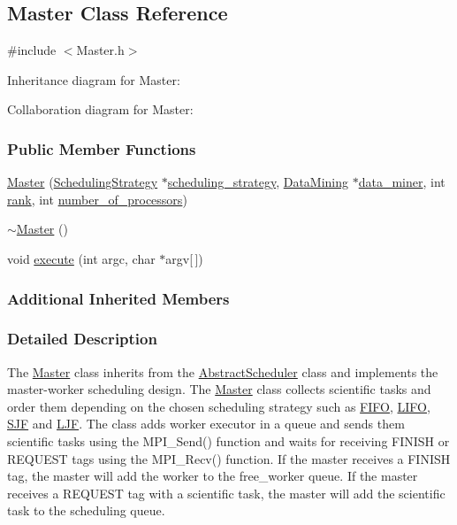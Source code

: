 \hypertarget{a00026}{}\subsection{Master Class Reference}
\label{a00026}


{\ttfamily \#include $<$Master.\+h$>$}



Inheritance diagram for Master\+:


Collaboration diagram for Master\+:
\subsubsection*{Public Member Functions}
\begin{DoxyCompactItemize}
\item 
\hyperlink{a00026_a4ffd1a0c99fc39712ac89c50f87dedfa}{Master} (\hyperlink{a00033}{Scheduling\+Strategy} $\ast$\hyperlink{a00004_a7dd11eee79bfb44c820d6c28480fd0c7}{scheduling\+\_\+strategy}, \hyperlink{a00013}{Data\+Mining} $\ast$\hyperlink{a00004_a6e281d90fa4b965779cd13eabf7d0249}{data\+\_\+miner}, int \hyperlink{a00015_a33c24e2887b4d9c4ef7f3566d3bc803e}{rank}, int \hyperlink{a00015_a4e798bde66d26fe200de7e8d2b54e915}{number\+\_\+of\+\_\+processors})
\item 
\hyperlink{a00026_a20f70958ed75532ba672af1b780f59eb}{$\sim$\+Master} ()
\item 
void \hyperlink{a00026_acea94dce898273bbbddfaae52f243bca}{execute} (int argc, char $\ast$argv\mbox{[}$\,$\mbox{]})
\end{DoxyCompactItemize}
\subsubsection*{Additional Inherited Members}


\subsubsection{Detailed Description}
The \hyperlink{a00026}{Master} class inherits from the \hyperlink{a00004}{Abstract\+Scheduler} class and implements the master-\/worker scheduling design. The \hyperlink{a00026}{Master} class collects scientific tasks and order them depending on the chosen scheduling strategy such as \hyperlink{a00016}{F\+I\+F\+O}, \hyperlink{a00022}{L\+I\+F\+O}, \hyperlink{a00035}{S\+J\+F} and \hyperlink{a00024}{L\+J\+F}. The class adds worker executor in a queue and sends them scientific tasks using the M\+P\+I\+\_\+\+Send() function and waits for receiving F\+I\+N\+I\+S\+H or R\+E\+Q\+U\+E\+S\+T tags using the M\+P\+I\+\_\+\+Recv() function. If the master receives a F\+I\+N\+I\+S\+H tag, the master will add the worker to the free\+\_\+worker queue. If the master receives a R\+E\+Q\+U\+E\+S\+T tag with a scientific task, the master will add the scientific task to the scheduling queue.

